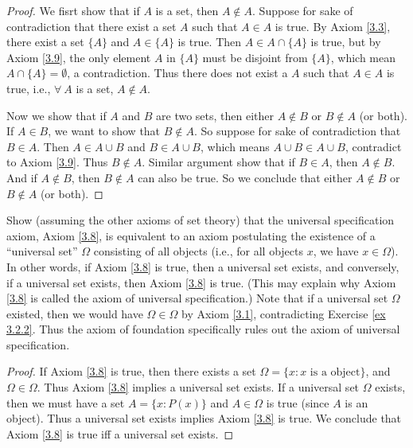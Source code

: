 \begin{proof}
We fisrt show that if \(A\) is a set, then \(A \notin A\).
Suppose for sake of contradiction that there exist a set \(A\) such that \(A \in A\) is true.
By Axiom \ref{3.3}, there exist a set \(\{A\}\) and \(A \in \{A\}\) is true.
Then \(A \in A \cap \{A\}\) is true, but by Axiom \ref{3.9}, the only element \(A\) in \(\{A\}\) must be disjoint from \(\{A\}\), which mean \(A \cap \{A\} = \emptyset\), a contradiction.
Thus there does not exist a \(A\) such that \(A \in A\) is true, i.e., \(\forall\ A\) is a set, \(A \notin A\).

Now we show that if \(A\) and \(B\) are two sets, then either \(A \notin B\) or \(B \notin A\) (or both).
If \(A \in B\), we want to show that \(B \notin A\).
So suppose for sake of contradiction that \(B \in A\).
Then \(A \in A \cup B\) and \(B \in A \cup B\), which means \(A \cup B \in A \cup B\), contradict to Axiom \ref{3.9}.
Thus \(B \notin A\).
Similar argument show that if \(B \in A\), then \(A \notin B\).
And if \(A \notin B\), then \(B \notin A\) can also be true.
So we conclude that either \(A \notin B\) or \(B \notin A\) (or both).
\end{proof}

\begin{exercise}\label{ex 3.2.3}
Show (assuming the other axioms of set theory) that the universal specification axiom, Axiom \ref{3.8}, is equivalent to an axiom postulating the existence of a ``universal set'' \(\Omega\) consisting of all objects (i.e., for all objects \(x\), we have \(x \in \Omega\)).
In other words, if Axiom \ref{3.8} is true, then a universal set exists, and conversely, if a universal set exists, then Axiom \ref{3.8} is true.
(This may explain why Axiom \ref{3.8} is called the axiom of universal specification.)
Note that if a universal set \(\Omega\) existed, then we would have \(\Omega \in \Omega\) by Axiom \ref{3.1}, contradicting Exercise \ref{ex 3.2.2}.
Thus the axiom of foundation specifically rules out the axiom of universal specification.
\end{exercise}

\begin{proof}
If Axiom \ref{3.8} is true, then there exists a set \(\Omega = \{x: x \text{ is a object}\}\), and \(\Omega \in \Omega\).
Thus Axiom \ref{3.8} implies a universal set exists.
If a universal set \(\Omega\) exists, then we must have a set \(A = \{x: P(x)\}\) and \(A \in \Omega\) is true (since \(A\) is an object).
Thus a universal set exists implies Axiom \ref{3.8} is true.
We conclude that Axiom \ref{3.8} is true iff a universal set exists.
\end{proof}